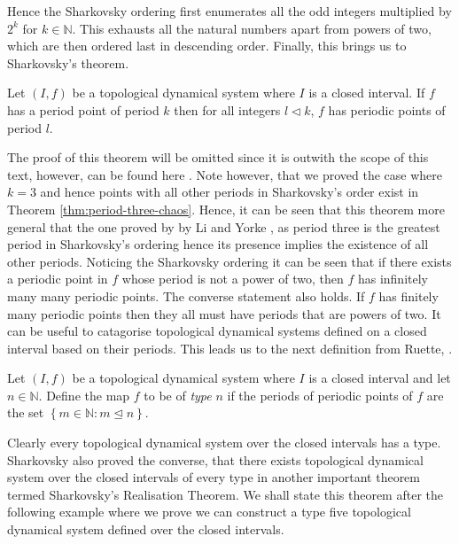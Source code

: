 Hence the Sharkovsky ordering first enumerates all the odd integers multiplied by $2^k$ for $k \in \mathbb{N}$. This exhausts all the natural numbers apart from powers of two, which are then ordered last in descending order. Finally, this brings us to Sharkovsky's theorem.

\begin{thm} \label{thm:sharkovskys-forcing-theorem}
    Let $(I, f)$ be a topological dynamical system where $I$ is a closed interval. If $f$ has a period point of period $k$ then for all integers $l \lhd k$, $f$ has periodic points of period $l$.
\end{thm}

The proof of this theorem will be omitted since it is outwith the scope of this text, however, can be found here \cite{sharkovsky}. Note however, that we proved the case where $k = 3$ and hence points with all other periods in Sharkovsky's order exist in Theorem \ref{thm:period-three-chaos}. Hence, it can be seen that this theorem more general that the one proved by by Li and Yorke \cite{li-yorke}, as period three is the greatest period in Sharkovsky's ordering hence its presence implies the existence of all other periods. Noticing the Sharkovsky ordering it can be seen that if there exists a periodic point in $f$ whose period is not a power of two, then $f$ has infinitely many many periodic points. The converse statement also holds. If $f$ has finitely many periodic points then they all must have periods that are powers of two. It can be useful to catagorise topological dynamical systems defined on a closed interval based on their periods. This leads us to the next definition from Ruette, \cite[\S 3.3]{ruette}.

\begin{defn}[Type] \label{def:type}
    Let $(I, f)$ be a topological dynamical system where $I$ is a closed interval and let $n \in \mathbb{N}$. Define the map $f$ to be of \emph{type} $n$ if the periods of periodic points of $f$ are the set $\left\lbrace m \in \mathbb{N} : m \unlhd n \right\rbrace$.
\end{defn}

Clearly every topological dynamical system over the closed intervals has a type. Sharkovsky also proved the converse, that there exists topological dynamical system over the closed intervals of every type in another important theorem termed Sharkovsky's Realisation Theorem. We shall state this theorem after the following example where we prove we can construct a type five topological dynamical system defined over the closed intervals.

